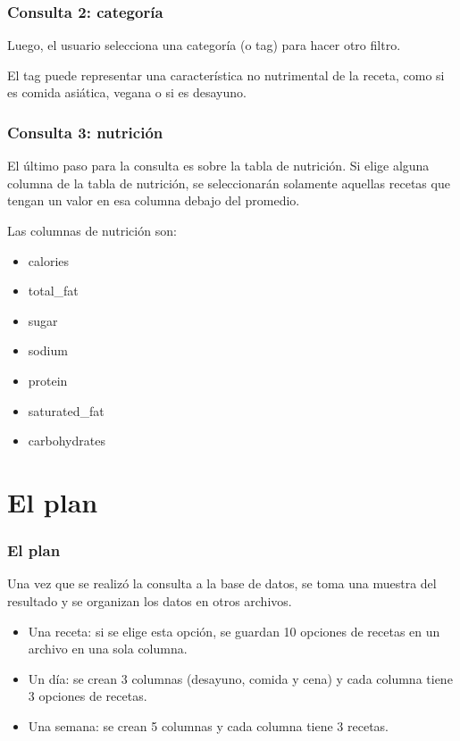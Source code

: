\documentclass[11pt, aspectratio=169]{beamer}
\begin{document}
\begin{frame}
\frametitle{Consulta 2: categoría}

Luego, el usuario selecciona una categoría (o tag) para hacer otro filtro.

El tag puede representar una característica no nutrimental de la receta, como si es comida asiática, vegana o si es desayuno.

\end{frame}

\begin{frame}
\frametitle{Consulta 3: nutrición}

El último paso para la consulta es sobre la tabla de nutrición. Si elige alguna columna de la tabla de nutrición, se seleccionarán solamente aquellas recetas que tengan un valor en esa columna debajo del promedio.

Las columnas de nutrición son:
\begin{itemize}
\item calories
\item total\_fat
\item sugar
\item sodium
\item protein
\item saturated\_fat
\item carbohydrates
\end{itemize}

\end{frame}

\section{El plan}

\begin{frame}
\frametitle{El plan}

Una vez que se realizó la consulta a la base de datos, se toma una muestra del resultado y se organizan los datos en otros archivos.

\begin{itemize}
\item Una receta: si se elige esta opción, se guardan 10 opciones de recetas en un archivo en una sola columna.
\item Un día: se crean 3 columnas (desayuno, comida y cena) y cada columna tiene 3 opciones de recetas.
\item Una semana: se crean 5 columnas y cada columna tiene 3 recetas.
\end{itemize}

\end{frame}
\end{document}
